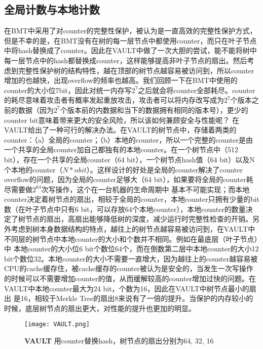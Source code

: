 \subsection{全局计数与本地计数}
在BMT中采用了对counter的完整性保护，被认为是一直高效的完整性保护方式，但是不幸的是，在BMT没有在树的每一层节点中都使用counter，而只在叶子节点中将hash替换成了counter。因此在VAULT中做了一次大胆的尝试，能不能将树中每一层节点中的hash都替换成counter，这样能够提高非叶子节点的扇出。然后考虑到完整性保护树的结构特性，越在顶部的树节点越容易被访问到，所以counter
增加的也越快，出现overflow的频率也越高。我们回顾一下在BMT中使用的counter的大小位7bit，因此对统一内存写$2^7$之后就会将counter全部耗尽。counter的耗尽意味着攻击者有概率发起重放攻击，攻击者可以将内存改写成为$2^7$个版本之前的数据（因为$2^7$个版本前的内数据和当下的数据拥有相同的版本号），更少的counter bit意味着带来更大的安全风险，所以该如何兼顾安全与性能呢？
在VAULT给出了一种可行的解决办法。在VAULT的树节点中，存储着两类的counter：（a）全局的counter；（b）本地的counter，所以一个完整的counter是由一个共享的全局counter加自己都独有的本地counter。在一个树节点中（512 bit），存在一个共享的全局counter（64 bit），一个树节点hash值（64 bit）以及N个本地的counter（$N*n bit$）。这样设计的好处是全局的counter解决了counter overflow的问题，因为全局的counter足够大（64 bit），如果要将全局的counter耗尽需要做$2^64$次写操作，这个在一台机器的生命周期中
基本不可能实现；而本地counter决定着树节点的扇出，相较于全局的counter，本地counter只拥有少量的bit数（在叶子节点中只有6 bit，可以存放64个本地counter），本地counter的数量决定了树节点的扇出，高扇出能够降低树的深度，减少运行时完整性检查的开销。另外考虑到树本身数据结构的特点，越往上的树节点越容易被访问到，在VAULT中不同层的树节点中本地counter的大小和个数并不相同。例如在最底层（叶子节点）中
本地counter的大小位6 bit个数位64个，而在倒数第二层中本地counter的大小12 bit个数位32。本地counter的大小不需要一直增大，因为越往上的counter越容易被CPU的cache缓存住，被cache缓存的counter被认为是安全的，当发生一次写操作的时候可以不需要增加counter的值，从而缓解较高的counter增加过快的问题。在VAULT中本地counter最大为24 bit，个数为16，因此在VAULT中树节点最小的扇出
是16，相较于Merkle Tree的扇出8来说有了一倍的提升。当保护的内存较小的时候，底层树节点的扇出更大，对性能的提升也更加的明显。

\begin{figure}[!htp]
    \centering
    \texttt{[image: VAULT.png]}
    \caption{\textbf{VAULT }用counter替换hash，树节点的扇出分别为64, 32, 16}
   \label{fig: VAULT.png}
\end{figure}
